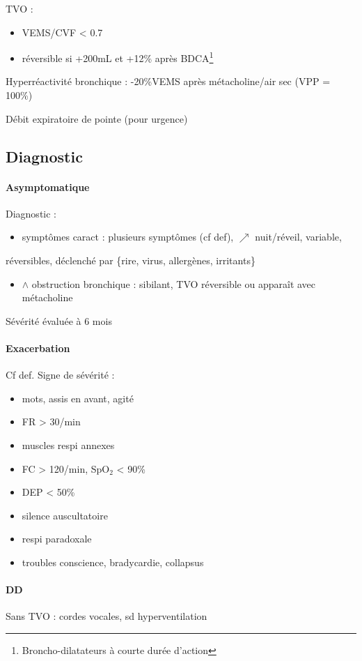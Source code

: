TVO : 
\begin{itemize}
\item VEMS/CVF < 0.7
\item réversible si +200mL et +12\% après BDCA\footnote{Broncho-dilatateurs à courte durée
d'action}
\end{itemize}

Hyperréactivité bronchique : -20\%VEMS après métacholine/air sec (VPP = 100\%)

Débit expiratoire de pointe (pour urgence)

\subsection{Diagnostic}
\paragraph{Asymptomatique}
Diagnostic :
\begin{itemize}
\item symptômes caract : plusieurs symptômes (cf def), $\nearrow$ nuit/réveil, variable,
\end{itemize}
réversibles, déclenché par \{rire, virus, allergènes, irritants\}
\begin{itemize}
\item \(\wedge\) obstruction bronchique : sibilant, TVO réversible ou apparaît avec métacholine
\end{itemize}
Sévérité évaluée à 6 mois
\paragraph{Exacerbation}
Cf def. Signe de sévérité :
\begin{itemize}
\item mots, assis en avant, agité
\item FR > 30/min
\item muscles respi annexes
\item FC > 120/min, SpO\(_{\text{2}}\) < 90\%
\item DEP < 50\%
\item silence auscultatoire \skull
\item respi paradoxale \skull
\item troubles conscience, bradycardie, collapsus \skull
\end{itemize}
\paragraph{DD}
Sans TVO : cordes vocales, sd hyperventilation

